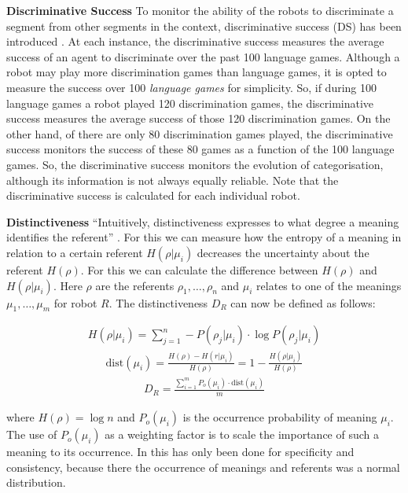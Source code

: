 \begin{description}
\item {\bf Discriminative Success} To monitor the ability of
the robots to discriminate a segment from other segments in the
context, discriminative success (DS) has been introduced \citep{steels:1996b}. At each instance, the discriminative success measures the average
success of an agent to discriminate over the past 100 language
games. Although a robot may play more discrimination games than
language games, it is opted to measure the success over 100 {\em
language games} for simplicity. So, if during 100 language games
a robot played 120 discrimination games, the discriminative success measures the average
success of those 120 discrimination games. On the other hand, of there are only 80 discrimination games played, the discriminative success monitors the success of these 80 games as a function of the 100 language games. So, the discriminative success
monitors the evolution of categorisation, although its information is not always equally reliable. Note that the discriminative success is calculated for each individual robot.
\item {\bf Distinctiveness} ``Intuitively, distinctiveness expresses to what degree a meaning identifies the referent'' \citep{dejong:2000}. For this we can measure how the entropy of a meaning in relation to a certain referent $H(\rho|\mu_i)$ decreases the uncertainty about the referent $H(\rho)$. For this we can calculate the difference between $H(\rho)$ and $H(\rho|\mu_i)$. Here $\rho$ are the referents $\rho_1,\ldots,\rho_n$ and $\mu_i$ relates to one of the meanings $\mu_1,\ldots,\mu_m$ for robot $R$. The distinctiveness $D_R$ can now be defined as follows:

\begin{eqnarray}
H(\rho|\mu_i)=\sum_{j=1}^n -P(\rho_j|\mu_i) \cdot \log P(\rho_j|\mu_i)
\end{eqnarray}
\begin{eqnarray}
\mbox{dist}(\mu_i)=\frac{H(\rho)-H(r|\mu_i)}{H(\rho)}=1-\frac{H(\rho|\mu_i)}{H(\rho)}
\end{eqnarray}
\begin{eqnarray}
D_R=\frac{\sum_{i=1}^m P_o(\mu_i) \cdot \mbox{dist}(\mu_i)}{m}
\end{eqnarray}


where $H(\rho)=\log n$ and $P_o(\mu_i)$ is the occurrence probability of meaning $\mu_i$. The use of $P_o(\mu_i)$ as a weighting factor is to scale the importance of such a meaning to its occurrence. In \citep{dejong:2000} this has only been done for specificity and consistency, because there the occurrence of meanings and referents was a normal distribution.


\end{description}
